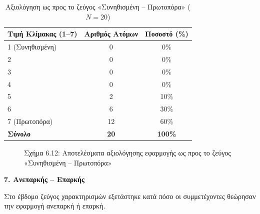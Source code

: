 \documentclass[twoside, a4paper, 11pt]{article}
\begin{document}
\begin{table}[H]
    \centering
    \caption{Αξιολόγηση ως προς το ζεύγος «Συνηθισμένη – Πρωτοπόρα» ($N = 20$)}
    \begin{tabular}{|l|c|c|}
        \hline
        \textbf{Τιμή Κλίμακας (1–7)} & \textbf{Αριθμός Ατόμων} & \textbf{Ποσοστό (\%)} \\ \hline
        1 (Συνηθισμένη) & 0 & 0\% \\ \hline
        2 & 0 & 0\% \\ \hline
        3 & 0 & 0\% \\ \hline
        4 & 0 & 0\% \\ \hline
        5 & 2 & 10\% \\ \hline
        6 & 6 & 30\% \\ \hline
        7 (Πρωτοπόρα) & 12 & 60\% \\ \hline
        \textbf{Σύνολο} & \textbf{20} & \textbf{100\%} \\ \hline
    \end{tabular}
\end{table}

\begin{figure}[H]
    \centering
    \caption{Σχήμα 6.12: Αποτελέσματα αξιολόγησης εφαρμογής ως προς το ζεύγος «Συνηθισμένη – Πρωτοπόρα»}
\end{figure}

\vspace{1em}
\noindent\textbf{7. Ανεπαρκής – Επαρκής}

Στο έβδομο ζεύγος χαρακτηρισμών εξετάστηκε κατά πόσο οι συμμετέχοντες θεώρησαν την εφαρμογή ανεπαρκή ή επαρκή.
\end{document}
